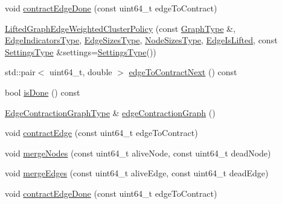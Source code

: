 \begin{DoxyCompactItemize}
\item 
void \hyperlink{classnifty_1_1graph_1_1agglo_1_1LiftedGraphEdgeWeightedClusterPolicy_aa5bcb1829765b56a0fc10a82be501cc0}{contract\+Edge\+Done} (const uint64\+\_\+t edge\+To\+Contract)
\item 
\hyperlink{classnifty_1_1graph_1_1agglo_1_1LiftedGraphEdgeWeightedClusterPolicy_ab7ae607d3f0b14dea37488433e97c91d}{Lifted\+Graph\+Edge\+Weighted\+Cluster\+Policy} (const \hyperlink{classnifty_1_1graph_1_1agglo_1_1LiftedGraphEdgeWeightedClusterPolicy_a09555efd4d9896f60e2225f905a6600c}{Graph\+Type} \&, \hyperlink{classnifty_1_1graph_1_1agglo_1_1LiftedGraphEdgeWeightedClusterPolicy_ad402115dae3b01054a62b0573f84fcab}{Edge\+Indicators\+Type}, \hyperlink{classnifty_1_1graph_1_1agglo_1_1LiftedGraphEdgeWeightedClusterPolicy_ad544c54e73b2ce0be17ae1061dcec9ed}{Edge\+Sizes\+Type}, \hyperlink{classnifty_1_1graph_1_1agglo_1_1LiftedGraphEdgeWeightedClusterPolicy_aec2d1f0ad4c63bb5847322c094a557cb}{Node\+Sizes\+Type}, \hyperlink{classnifty_1_1graph_1_1agglo_1_1LiftedGraphEdgeWeightedClusterPolicy_a8294f4c5a6745b1898f9ecf65e486cf6}{Edge\+Is\+Lifted}, const \hyperlink{structnifty_1_1graph_1_1agglo_1_1LiftedGraphEdgeWeightedClusterPolicy_1_1SettingsType}{Settings\+Type} \&settings=\hyperlink{structnifty_1_1graph_1_1agglo_1_1LiftedGraphEdgeWeightedClusterPolicy_1_1SettingsType}{Settings\+Type}())
\item 
std\+::pair$<$ uint64\+\_\+t, double $>$ \hyperlink{classnifty_1_1graph_1_1agglo_1_1LiftedGraphEdgeWeightedClusterPolicy_a58b578b4c85c6818f990ba21c4079a9d}{edge\+To\+Contract\+Next} () const
\item 
bool \hyperlink{classnifty_1_1graph_1_1agglo_1_1LiftedGraphEdgeWeightedClusterPolicy_a99bd335a2282e1ea16e062340d480a3a}{is\+Done} () const
\item 
\hyperlink{classnifty_1_1graph_1_1agglo_1_1LiftedGraphEdgeWeightedClusterPolicy_a20c8dc11217be76cda874a9ef9720e92}{Edge\+Contraction\+Graph\+Type} \& \hyperlink{classnifty_1_1graph_1_1agglo_1_1LiftedGraphEdgeWeightedClusterPolicy_ac94fd9193c674df9e2c3afb9cd3781ae}{edge\+Contraction\+Graph} ()
\item 
void \hyperlink{classnifty_1_1graph_1_1agglo_1_1LiftedGraphEdgeWeightedClusterPolicy_a39565820aad23066cf2cf8daf56c901c}{contract\+Edge} (const uint64\+\_\+t edge\+To\+Contract)
\item 
void \hyperlink{classnifty_1_1graph_1_1agglo_1_1LiftedGraphEdgeWeightedClusterPolicy_afd367a30ccd5dfb8a5d4f031611e22fb}{merge\+Nodes} (const uint64\+\_\+t alive\+Node, const uint64\+\_\+t dead\+Node)
\item 
void \hyperlink{classnifty_1_1graph_1_1agglo_1_1LiftedGraphEdgeWeightedClusterPolicy_a5ef49637ecb3c1481418fc139a236e5c}{merge\+Edges} (const uint64\+\_\+t alive\+Edge, const uint64\+\_\+t dead\+Edge)
\item 
void \hyperlink{classnifty_1_1graph_1_1agglo_1_1LiftedGraphEdgeWeightedClusterPolicy_a0a027c78e42fc174ee93884892c0293a}{contract\+Edge\+Done} (const uint64\+\_\+t edge\+To\+Contract)
\end{DoxyCompactItemize}
